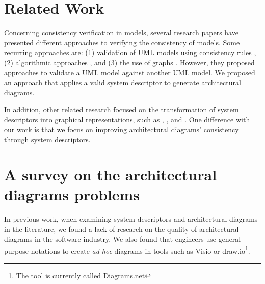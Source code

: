 \documentclass[sigconf]{acmart}
\begin{document}


\section{Related Work}
\label{sec:related-work}

Concerning consistency verification in models, several research papers have presented different approaches to verifying the consistency of models. Some recurring approaches are: (1) validation of UML models using consistency rules \cite{Ha2003, Amor2011}, (2) algorithmic approaches \cite{litvak2003}, and (3) the use of graphs \cite{Mohammadi2014}. However, they proposed approaches to validate a UML model against another UML model. We proposed an approach that applies a valid system descriptor to generate architectural diagrams.

In addition, other related research focused on the transformation of system descriptors into graphical representations, such as \cite{piedade2020}, \cite{burco2020}, and \cite{sandobalin2019}.
One difference with our work is that we focus on improving architectural diagrams' consistency through system descriptors.




\section{A survey on the architectural diagrams problems}
\label{sec:survey}

In previous work\cite{nicacio2021}, when examining system descriptors and architectural diagrams in the literature, we found a lack of research on the quality of architectural diagrams in the software industry. We also found that engineers use general-purpose notations to create \textit{ad hoc} diagrams in tools such as Visio or draw.io\footnote{The tool is currently called Diagrams.net}.
\end{document}
